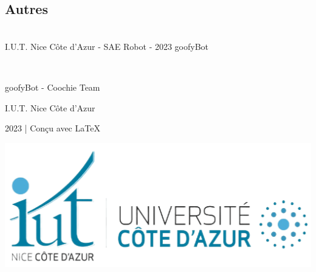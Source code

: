 \subsection{Autres}

\vfill
\noindent\makebox[\linewidth]{\rule{.8\paperwidth}{.6pt}}\\[0.2cm]
I.U.T. Nice Côte d'Azur - SAE Robot - 2023 \hfill goofyBot
\noindent\makebox[\linewidth]{\rule{.8\paperwidth}{.6pt}}













\newpage

\thispagestyle{empty}
~
\vfill
\begin{center}

\large goofyBot - Coochie Team

\large I.U.T. Nice Côte d'Azur

\large 2023 | Conçu avec \LaTeX

\centering
\includegraphics[width=.3\linewidth]{img/logos/iut.png}
\end{center}